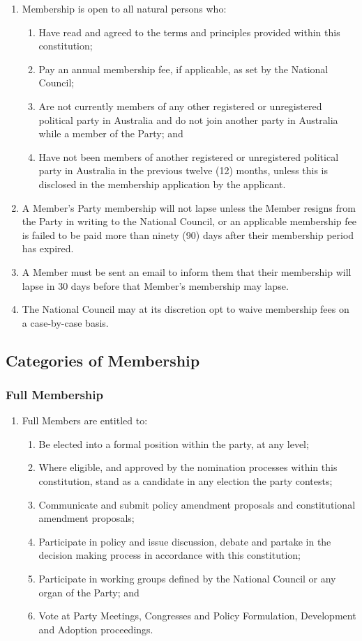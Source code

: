 \documentclass[a4paper,titlepage,8.5pt]{article}
\begin{document}
\begin{enumerate}
\item Membership is open to all natural persons who:
\begin{enumerate}
\item Have read and agreed to the terms and principles provided within this constitution;
\item Pay an annual membership fee, if applicable, as set by the National Council;
\item Are not currently members of any other registered or unregistered political party in Australia and do not join another party in Australia while a member of the Party; and
\item Have not been members of another registered or unregistered political party in Australia in the previous twelve (12) months, unless this is disclosed in the membership application by the applicant.
\end{enumerate}
\item A Member's Party membership will not lapse unless the Member resigns from the Party in writing to the National Council, or an applicable membership fee is failed to be paid more than ninety (90) days after their membership period has expired.
\item A Member must be sent an email to inform them that their membership will lapse in 30 days before that Member's membership may lapse.
\item The National Council may at its discretion opt to waive membership fees on a case-by-case basis.
\end{enumerate}

\subsection{Categories of Membership}

\subsubsection{Full Membership}

\begin{enumerate}
\item Full Members are entitled to:
\begin{enumerate}
\item Be elected into a formal position within the party, at any level;
\item Where eligible, and approved by the nomination processes within this constitution, stand as a candidate in any election the party contests;
\item Communicate and submit policy amendment proposals and constitutional amendment proposals;
\item Participate in policy and issue discussion, debate and partake in the decision making process in accordance with this constitution;
\item Participate in working groups defined by the National Council or any organ of the Party; and
\item Vote at Party Meetings, Congresses and Policy Formulation, Development and Adoption proceedings.
\end{enumerate}
\end{enumerate}
\end{document}
